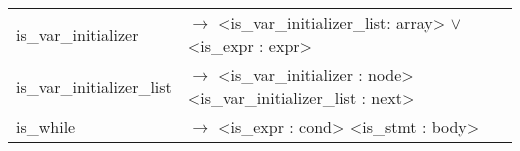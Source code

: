 \documentclass[a4paper]{article}
\begin{document}
\begin{tabular}{ll}
\begin{comment}
typedef struct _is_class_stmt
{
	is_class_stmt_privacy* privacy; /* nullable */
	struct _is_class_stmt_scope* scope;	/* nullable */
	struct _is_member_stmt* stmt;
} is_class_stmt;

typedef struct _is_class_stmt_list
{
	struct _is_class_stmt* node;
	struct _is_class_stmt_list* next;
} is_class_stmt_list;

typedef enum
{
	t_constant_bool,
	t_constant_long,
	t_constant_double,
	t_constant_char,
	t_constant_string
} type_constant;

typedef struct _is_constant
{
	type_constant type;
	union
	{
		bool bool_val;
		long long long_val;
		long double double_val;
		/* char char_val; it's not used since char is now a '<char>' string (including the inverted commas) */
		char* string_val;
	} value;
} is_constant;
\end{comment}

\begin{comment}
==================================================== SEPARATOR ====================================================
\end{comment}

	is\_var\_initializer 					& $\to$ <is\_var\_initializer\_list: array> $\vee$ <is\_expr : expr> \\
	is\_var\_initializer\_list				& $\to$ <is\_var\_initializer : node> <is\_var\_initializer\_list : next> \\
	is\_while 								& $\to$ <is\_expr : cond> <is\_stmt : body> \\
\end{tabular}
\end{document}
